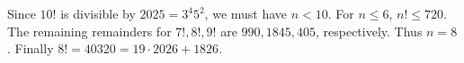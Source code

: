 Since $10!$ is divisible by $2025=3^4 5^2$, we must have $n<10$. For $n\le6$, $n!\le720$. The remaining remainders for $7!,8!,9!$ are $990,1845,405$, respectively. Thus $n=8$. Finally $8!=40320=19\cdot2026+\boxed{1826}$.
